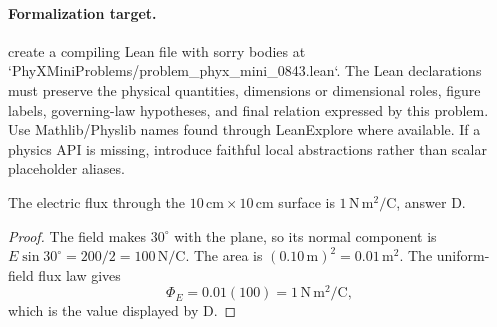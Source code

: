 \paragraph{Formalization target.}
create a compiling Lean file with sorry bodies at `PhyXMiniProblems/problem\_phyx\_mini\_0843.lean`. The Lean declarations must preserve the physical quantities, dimensions or dimensional roles, figure labels, governing-law hypotheses, and final relation expressed by this problem.
Use Mathlib/Physlib names found through LeanExplore where available. If a physics API is missing, introduce faithful local abstractions rather than scalar placeholder aliases.

\begin{theorem}
\label{thm:physics:phyx_mini_0843:target}
The electric flux through the \(10\,\mathrm{cm}\times10\,\mathrm{cm}\)
surface is \(1\,\mathrm{N\,m^2/C}\), answer D.
\end{theorem}
\begin{proof}
The field makes \(30^\circ\) with the plane, so its normal component is
\(E\sin30^\circ=200/2=100\,\mathrm{N/C}\).  The area is
\((0.10\,\mathrm m)^2=0.01\,\mathrm{m^2}\).  The uniform-field flux law gives
\[
 \Phi_E=0.01(100)=1\,\mathrm{N\,m^2/C},
\]
which is the value displayed by D.
\end{proof}

